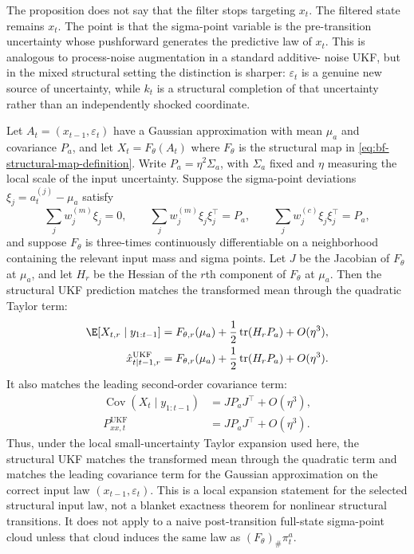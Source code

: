 The proposition does not say that the filter stops targeting $x_t$.  The
filtered state remains $x_t$.  The point is that the sigma-point variable is the
pre-transition uncertainty whose pushforward generates the predictive law of
$x_t$.  This is analogous to process-noise augmentation in a standard additive-
noise UKF, but in the mixed structural setting the distinction is sharper:
$\varepsilon_t$ is a genuine new source of uncertainty, while $k_t$ is a
structural completion of that uncertainty rather than an independently shocked
coordinate.

\begin{proposition}
\label{prop:bf-structural-ukf-ut-accuracy}
Let $A_t=(x_{t-1},\varepsilon_t)$ have a Gaussian approximation with mean
$\mu_a$ and covariance $P_a$, and let
$X_t=F_\theta(A_t)$ where $F_\theta$ is the structural map in
\eqref{eq:bf-structural-map-definition}.  Write
$P_a=\eta^2\Sigma_a$, with $\Sigma_a$ fixed and $\eta$ measuring the local
scale of the input uncertainty.  Suppose the sigma-point deviations
$\xi_j=a_t^{(j)}-\mu_a$ satisfy
\begin{equation}
  \sum_j w_j^{(m)}\xi_j=0,
  \qquad
  \sum_j w_j^{(m)}\xi_j\xi_j^\top=P_a,
  \qquad
  \sum_j w_j^{(c)}\xi_j\xi_j^\top=P_a,
\end{equation}
and suppose $F_\theta$ is three-times continuously differentiable on a
neighborhood containing the relevant input mass and sigma points.  Let $J$ be
the Jacobian of $F_\theta$ at $\mu_a$, and let $H_r$ be the Hessian of the
$r$th component of $F_\theta$ at $\mu_a$.  Then the structural UKF prediction
matches the transformed mean through the quadratic Taylor term:
\begin{align}
  \E[X_{t,r}\mid y_{1:t-1}]
    &=
    F_{\theta,r}(\mu_a)
    +\frac{1}{2}\operatorname{tr}(H_rP_a)
    +O(\eta^3),\\
  \hat x_{t|t-1,r}^{\mathrm{UKF}}
    &=
    F_{\theta,r}(\mu_a)
    +\frac{1}{2}\operatorname{tr}(H_rP_a)
    +O(\eta^3).
    \label{eq:bf-structural-ukf-second-order-mean}
\end{align}
It also matches the leading second-order covariance term:
\begin{align}
  \operatorname{Cov}(X_t\mid y_{1:t-1})
    &=
    JP_aJ^\top+O(\eta^3),\\
  P_{xx,t}^{\mathrm{UKF}}
    &=
    JP_aJ^\top+O(\eta^3).
    \label{eq:bf-structural-ukf-second-order-cov}
\end{align}
Thus, under the local small-uncertainty Taylor expansion used here, the
structural UKF matches the transformed mean through the quadratic term and
matches the leading covariance term for the Gaussian approximation on the
correct input law $(x_{t-1},\varepsilon_t)$.  This is a local expansion
statement for the selected structural input law, not a blanket exactness theorem
for nonlinear structural transitions.  It does not apply to a naive
post-transition full-state sigma-point cloud unless that cloud induces the same
law as $(F_\theta)_\#\pi_t^a$.
\end{proposition}

